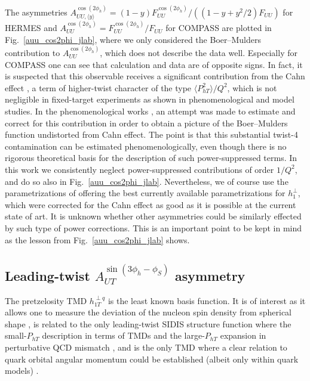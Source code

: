 \documentclass[a4paper,11pt]{article}
\newcommand{\la}{\langle}
\newcommand{\ra}{\rangle}
\def\Phperp{P_{hT}}
\begin{document}
The asymmetries  $A_{UU, \langle y\rangle}^{\cos(2\phi_h)}=(1-y)F_{UU}^{\cos(2\phi_h)}/((1-y + y^2/2)F_{UU})$
for HERMES \cite{Airapetian:2012yg} and $A_{UU}^{\cos(2\phi_h)}=F_{UU}^{\cos(2\phi_h)}/F_{UU}$ for COMPASS \cite{Adolph:2014pwc}
are plotted in Fig.~\ref{auu_cos2phi_jlab}, where we only considered the
Boer--Mulders contribution to $A_{UU}^{\cos(2\phi_h)}$, which does not describe
the data well. Especially for COMPASS one can see that calculation and
data are of opposite signs. In fact, it is suspected that this observable
receives a significant contribution from the Cahn effect \cite{Cahn:1978se},
a term of higher-twist character of the type $\la\Phperp^2\ra/Q^2$, which
is not negligible in fixed-target experiments as shown in
phenomenological \cite{Schweitzer:2010tt} and model \cite{Cao:2018qqf} studies.
In the phenomenological works
\cite{Barone:2009hw,Barone:2010gk,Barone:2015ksa}, an attempt was
made to estimate and correct for this contribution in order
to obtain a picture of the Boer--Mulders function undistorted
from Cahn effect. The point is that this substantial twist-4 contamination
can be estimated phenomenologically, even though there is no rigorous
theoretical basis for the description of such power-suppressed terms.
In this work we consistently neglect power-suppressed contributions of
order $1/Q^2$, and do so also in Fig.~\ref{auu_cos2phi_jlab}.
Nevertheless, we of course use the parametrizations of
\cite{Barone:2009hw,Barone:2010gk,Barone:2015ksa} offering
the best currently available parametrizations for $h_1^{\perp}$,
which were corrected for the Cahn effect as good as it is possible at
the current state of art. It is unknown whether other asymmetries
could be similarly effected by such type of power corrections.
This is an important point to be kept in mind as the lesson
from Fig.~\ref{auu_cos2phi_jlab} shows.



\subsection{\boldmath Leading-twist $A_{UT}^{\sin(3\phi_h-\phi_S)}$  asymmetry}
\label{Sec-5.6:pretzel-basis}

The pretzelosity TMD $h_{1T}^{\perp q}$ is the least known basis
function. It is of interest as it allows one to measure the deviation
of the nucleon spin density from spherical shape \cite{Miller:2007ae},
is related to the only leading-twist SIDIS structure function where the
small-$P_{hT}$ description in terms of TMDs and the large-$P_{hT}$ expansion
in perturbative QCD mismatch \cite{Bacchetta:2008xw}, and is the only TMD
where a clear relation to quark orbital angular momentum
could be established (albeit only within quark models)
\cite{Avakian:2008dz,She:2009jq,Avakian:2010br,Lorce:2011kn}.
\end{document}
